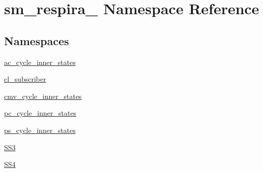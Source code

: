 \hypertarget{namespacesm__respira__1}{}\section{sm\+\_\+respira\+\_ Namespace Reference}
\label{namespacesm__respira__1}
\subsection*{Namespaces}
\begin{DoxyCompactItemize}
\item 
 \hyperlink{namespacesm__respira__1_1_1ac__cycle__inner__states}{ac\+\_\+cycle\+\_\+inner\+\_\+states}
\item 
 \hyperlink{namespacesm__respira__1_1_1cl__subscriber}{cl\+\_\+subscriber}
\item 
 \hyperlink{namespacesm__respira__1_1_1cmv__cycle__inner__states}{cmv\+\_\+cycle\+\_\+inner\+\_\+states}
\item 
 \hyperlink{namespacesm__respira__1_1_1pc__cycle__inner__states}{pc\+\_\+cycle\+\_\+inner\+\_\+states}
\item 
 \hyperlink{namespacesm__respira__1_1_1ps__cycle__inner__states}{ps\+\_\+cycle\+\_\+inner\+\_\+states}
\item 
 \hyperlink{namespacesm__respira__1_1_1SS3}{S\+S3}
\item 
 \hyperlink{namespacesm__respira__1_1_1SS4}{S\+S4}
\end{DoxyCompactItemize}
